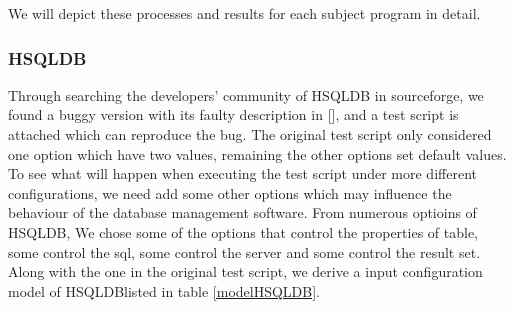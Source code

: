 \documentclass[10pt,journal,cspaper,compsoc]{IEEEtran}
\begin{document}
We will depict these processes and results for each subject program in detail.
\subsubsection{HSQLDB}
Through searching the developers' community of HSQLDB in sourceforge, we found a buggy version with its faulty description in [], and a test script is attached which can reproduce the bug. The original test script only considered one option which have two values, remaining the other options set default values. To see what will happen when executing the test script under more different configurations, we need add some other options which may influence the behaviour of the database management software. From numerous optioins of HSQLDB, We chose some of the options that control the properties of table, some control the sql, some control the server and some control the result set. Along with the one in the original test script, we derive a input configuration model of HSQLDBlisted in table \ref{modelHSQLDB}.
\end{document}
